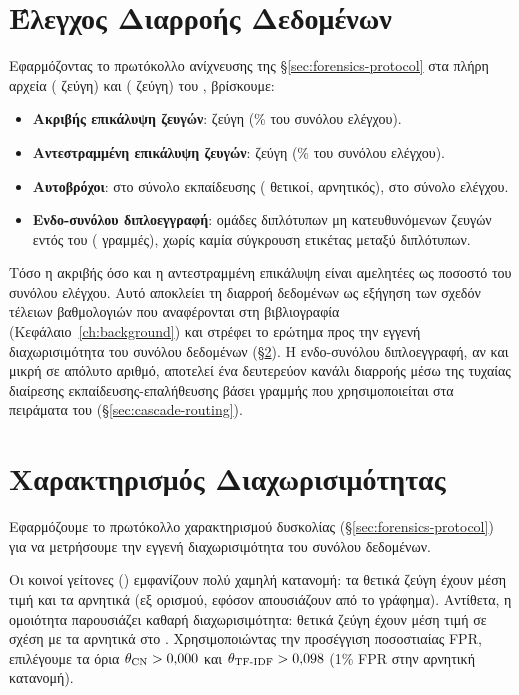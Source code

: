 \section{Έλεγχος Διαρροής Δεδομένων}
\label{sec:leakage-results}

Εφαρμόζοντας το πρωτόκολλο ανίχνευσης της \S\ref{sec:forensics-protocol} στα
πλήρη αρχεία \texttt{} (\TrainPairs{} ζεύγη) και \texttt{}
(\TestPairs{} ζεύγη) του , βρίσκουμε:

\begin{itemize}
    \item \textbf{Ακριβής επικάλυψη ζευγών}: \LeakageExact{} ζεύγη (\LeakageExactPct\% του συνόλου ελέγχου).
    \item \textbf{Αντεστραμμένη επικάλυψη ζευγών}: \LeakageReversed{} ζεύγη (\LeakageReversedPct\% του συνόλου
    ελέγχου).
    \item \textbf{Αυτοβρόχοι}: \SelfLoopsTrain{} στο σύνολο εκπαίδευσης (\SelfLoopsTrainPos{} θετικοί, \SelfLoopsTrainNeg{} αρνητικός), \SelfLoopsTest{} στο σύνολο ελέγχου.
    \item \textbf{Ενδο-συνόλου διπλοεγγραφή}: \IntraTrainDuplicates{} ομάδες διπλότυπων μη
    κατευθυνόμενων ζευγών εντός του \texttt{} (\IntraTrainDuplicatesRows{} γραμμές), χωρίς
    καμία σύγκρουση ετικέτας μεταξύ διπλότυπων.
\end{itemize}

Τόσο η ακριβής όσο και η αντεστραμμένη επικάλυψη είναι αμελητέες ως ποσοστό του
συνόλου ελέγχου.
Αυτό αποκλείει τη διαρροή δεδομένων ως εξήγηση των σχεδόν
τέλειων βαθμολογιών που αναφέρονται στη βιβλιογραφία (Κεφάλαιο~\ref{ch:background})
και στρέφει το ερώτημα προς την εγγενή διαχωρισιμότητα του συνόλου δεδομένων
(\S\ref{sec:separability-results}). Η ενδο-συνόλου διπλοεγγραφή, αν και μικρή σε
απόλυτο αριθμό, αποτελεί ένα δευτερεύον κανάλι διαρροής μέσω της τυχαίας
διαίρεσης εκπαίδευσης-επαλήθευσης βάσει γραμμής που χρησιμοποιείται στα
πειράματα του  (\S\ref{sec:cascade-routing}).


\section{Χαρακτηρισμός Διαχωρισιμότητας}
\label{sec:separability-results}

Εφαρμόζουμε το πρωτόκολλο χαρακτηρισμού δυσκολίας (\S\ref{sec:forensics-protocol})
για να μετρήσουμε την εγγενή διαχωρισιμότητα του συνόλου δεδομένων.

Οι κοινοί γείτονες () εμφανίζουν πολύ χαμηλή κατανομή: τα θετικά ζεύγη έχουν
μέση τιμή \StructCnMeanPos{} και τα αρνητικά \StructCnMeanNeg{} (εξ ορισμού, εφόσον απουσιάζουν από το γράφημα).
Αντίθετα, η ομοιότητα  παρουσιάζει καθαρή διαχωρισιμότητα: θετικά ζεύγη
έχουν μέση τιμή \StructTfidfMeanPos{} σε σχέση με τα αρνητικά στο \StructTfidfMeanNeg{}.
Χρησιμοποιώντας την
προσέγγιση ποσοστιαίας FPR, επιλέγουμε τα όρια $\theta_{\mathrm{CN}} > 0{,}000$ και
$\theta_{\mathrm{TF\text{-}IDF}} > 0{,}098$ (1\% FPR στην αρνητική κατανομή).

